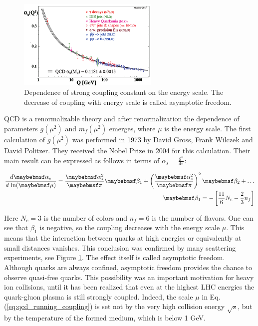\begin{figure}
  \centering
  \includegraphics[width = 0.6\textwidth]{illustrations/intro_illustrations/asymptotic_freedom.pdf}
  \caption{Dependence of strong coupling constant on the energy scale. The
           decrease of coupling with energy scale is called asymptotic freedom.}
  \label{fig:asymptotic_freedom}
\end{figure}

QCD is a renormalizable theory \cite{Kazakov:2008tr} and after
renormalization the dependence of parameters $g(\mu^2)$ and $m_f(\mu^2)$ emerges,
where $\mu$ is the energy scale.
The first calculation of $g(\mu^2)$ was performed in 1973 by David Gross, Frank
Wilczek and David Politzer. They received the Nobel Prize in 2004 for this calculation.
Their main result can be expressed as follows \cite{Gross:1998jx} in terms of $\alpha_s =
\frac{g^2}{4\pi}$:

\begin{align} \label{eq:qcd_running_coupling}
  \frac{d\alpha_s}{d \, \lnOf{\mu}} = \frac{\alpha_s^2}{\pi} \beta_1 +
                                           \parenths{\frac{\alpha_s^2}{\pi}}^2 \beta_2 + \dots \\
  \beta_1 = - \sqbracs{\frac{11}{6}N_c - \frac{2}{3} n_f}
\end{align}

Here $N_c = 3$ is the number of colors and $n_f = 6$ is the number of flavors. One
 can see that $\beta_1$ is negative, so the coupling decreases with the energy scale $\mu$.
This means that the interaction between quarks at high energies or equivalently
 at small distances vanishes. This conclusion was confirmed by many
scattering experiments, see Figure \ref{fig:asymptotic_freedom}. 
The effect itself is called asymptotic freedom. Although quarks are always confined,
asymptotic freedom provides the chance to observe quasi-free quarks.
This possibility was an important motivation for heavy ion collisions,
until it has been realized that even at the highest LHC energies the quark-gluon plasma
is still strongly coupled. Indeed, the scale $\mu$ in Eq. (\ref{eq:qcd_running_coupling})
is set not by the very high collision energy $\sqrt{s}$, but by the temperature
of the formed medium, which is below 1 GeV.

